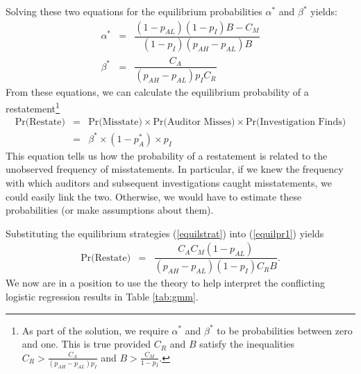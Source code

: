 \documentclass[12pt,reqno,titlepage]{amsart}
\theoremstyle{definition}
\begin{document}
\begin{doublespace}
Solving these two equations for the equilibrium probabilities $\alpha^*$ and $\beta^*$
yields:
\begin{equation}\label{equilstrat}
\begin{array}{lcl}
  \alpha^* &= & \dfrac{ ( 1 - p_{AL}) (1 - p_I) B- C_M}{ (1 - p_I) (p_{AH}-p_{AL}) B}\\[1.5em]
  \beta^* &= & \dfrac{C_A}{(p_{AH}-p_{AL}) p_I C_R}  
\end{array}
\end{equation}
From these equations, we can calculate the equilibrium probability of a restatement\footnote{
As part of the solution, we require $\alpha^*$ and $\beta^*$ to be probabilities between
zero and one. 
This is true provided $C_R$ and $B$ satisfy the inequalities
$ C_R > \frac{C_A}{(p_{AH}-p_{AL})p_I} $
and 
$ B > \frac{C_M}{1 - p_I}  $.}
\begin{equation} \label{equilpr1}
\begin{array}{lcl}
\mbox{Pr(Restate)} & = &  \mbox{Pr(Misstate)} \times \mbox{Pr(Auditor Misses)} \times
\mbox{Pr(Investigation Finds)}\\[1em]
& = & \beta^* \times (1-p_A^*) \times p_I
\end{array}\end{equation}
This equation tells us how the probability of a restatement is related to the unobserved frequency of misstatements.
In particular, if we knew the frequency with which auditors and subsequent investigations caught misstatements, we could easily link the two. 
Otherwise, we would have to estimate these probabilities (or make assumptions about them).

Substituting the equilibrium strategies (\ref{equilstrat}) into (\ref{equilpr1}) yields
\begin{equation} \label{equilpr2}
\begin{array}{lcl}
\mbox{Pr(Restate)}& = &  \dfrac{C_AC_M(1-p_{AL})}{(p_{AH}-p_{AL})(1-p_I)C_RB}.
\end{array}\end{equation}
We now are in a position to use the theory to help interpret the conflicting logistic regression results
in Table \ref{tab:gmm}. 


\end{doublespace}
\end{document}
